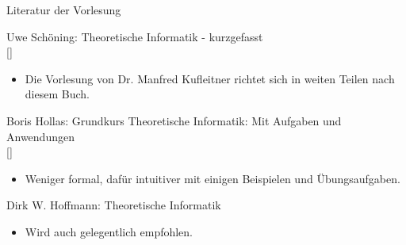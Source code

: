 \begin{frame}{Literatur der Vorlesung}
    \small{Uwe Schöning: Theoretische Informatik - kurzgefasst\\
    \phantom{}[]
    \begin{itemize}
        \item Die Vorlesung von Dr. Manfred Kufleitner richtet sich in weiten Teilen nach diesem Buch.
    \end{itemize}
    Boris Hollas: Grundkurs Theoretische Informatik: Mit Aufgaben und Anwendungen \\
    \phantom{}[]\\
    \begin{itemize}
        \item Weniger formal, dafür intuitiver mit einigen Beispielen und Übungsaufgaben.
    \end{itemize}
    Dirk W. Hoffmann: Theoretische Informatik
    \begin{itemize}
        \item Wird auch gelegentlich empfohlen.
    \end{itemize}}
    
\end{frame}
